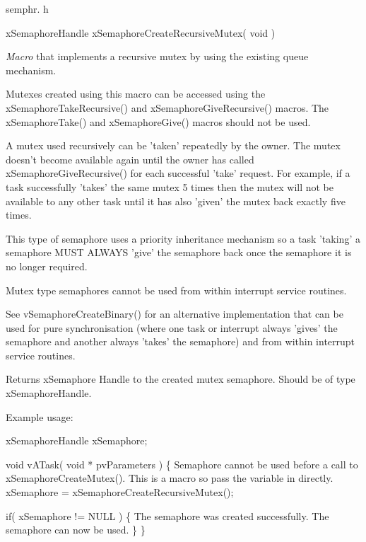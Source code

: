 semphr. h 
\begin{DoxyPre}xSemaphoreHandle xSemaphoreCreateRecursiveMutex( void )\end{DoxyPre}


{\itshape Macro} that implements a recursive mutex by using the existing queue mechanism.

Mutexes created using this macro can be accessed using the x\-Semaphore\-Take\-Recursive() and x\-Semaphore\-Give\-Recursive() macros. The x\-Semaphore\-Take() and x\-Semaphore\-Give() macros should not be used.

A mutex used recursively can be 'taken' repeatedly by the owner. The mutex doesn't become available again until the owner has called x\-Semaphore\-Give\-Recursive() for each successful 'take' request. For example, if a task successfully 'takes' the same mutex 5 times then the mutex will not be available to any other task until it has also 'given' the mutex back exactly five times.

This type of semaphore uses a priority inheritance mechanism so a task 'taking' a semaphore M\-U\-S\-T A\-L\-W\-A\-Y\-S 'give' the semaphore back once the semaphore it is no longer required.

Mutex type semaphores cannot be used from within interrupt service routines.

See v\-Semaphore\-Create\-Binary() for an alternative implementation that can be used for pure synchronisation (where one task or interrupt always 'gives' the semaphore and another always 'takes' the semaphore) and from within interrupt service routines.

\begin{DoxyReturn}{Returns}
x\-Semaphore Handle to the created mutex semaphore. Should be of type x\-Semaphore\-Handle.
\end{DoxyReturn}
Example usage\-: 
\begin{DoxyPre}
 xSemaphoreHandle xSemaphore;\end{DoxyPre}



\begin{DoxyPre} void vATask( void * pvParameters )
 \{
Semaphore cannot be used before a call to xSemaphoreCreateMutex().
This is a macro so pass the variable in directly.
    xSemaphore = xSemaphoreCreateRecursiveMutex();\end{DoxyPre}



\begin{DoxyPre}    if( xSemaphore != NULL )
    \{
The semaphore was created successfully.
The semaphore can now be used.  
    \}
 \}
 \end{DoxyPre}
 